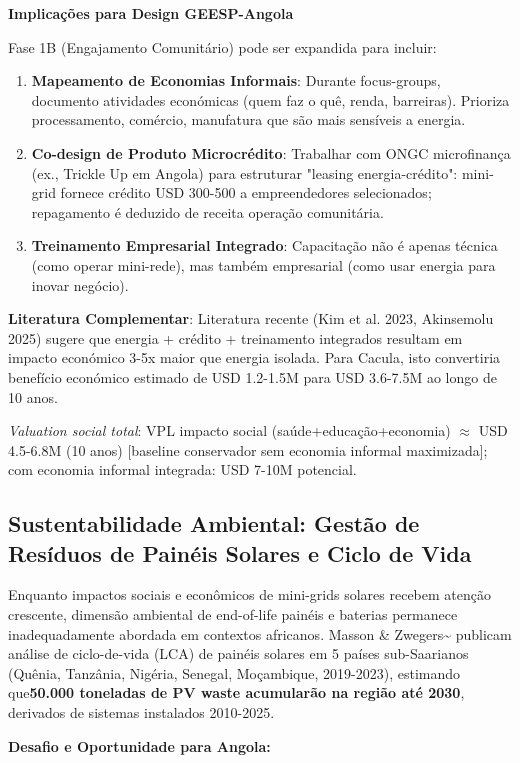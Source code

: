 \documentclass[12pt, a4paper]{article}
\begin{document}
\textbf{Implicações para Design GEESP-Angola}

Fase 1B (Engajamento Comunitário) pode ser expandida para incluir:
\begin{enumerate}
\item \textbf{Mapeamento de Economias Informais}: Durante focus-groups, documento atividades económicas (quem faz o quê, renda, barreiras). Prioriza processamento, comércio, manufatura que são mais sensíveis a energia.
\item \textbf{Co-design de Produto Microcrédito}: Trabalhar com ONGC microfinança (ex., Trickle Up em Angola) para estruturar "leasing energia-crédito": mini-grid fornece crédito USD 300-500 a empreendedores selecionados; repagamento é deduzido de receita operação comunitária.
\item \textbf{Treinamento Empresarial Integrado}: Capacitação não é apenas técnica (como operar mini-rede), mas também empresarial (como usar energia para inovar negócio).
\end{enumerate}

\textbf{Literatura Complementar}: Literatura recente (Kim et al. 2023, Akinsemolu 2025) sugere que energia + crédito + treinamento integrados resultam em impacto económico 3-5x maior que energia isolada. Para Cacula, isto convertiria benefício económico estimado de USD 1.2-1.5M para USD 3.6-7.5M ao longo de 10 anos.

\textit{Valuation social total}: VPL impacto social (saúde+educação+economia) $\approx$ USD 4.5-6.8M (10 anos) [baseline conservador sem economia informal maximizada]; com economia informal integrada: USD 7-10M potencial.

\subsection{Sustentabilidade Ambiental: Gestão de Resíduos de Painéis Solares e Ciclo de Vida}

Enquanto impactos sociais e econômicos de mini-grids solares recebem atenção crescente, dimensão ambiental de end-of-life painéis e baterias permanece inadequadamente abordada em contextos africanos. Masson \& Zwegers\textasciitilde{}\citep{Masson2023} publicam análise de ciclo-de-vida (LCA) de painéis solares em 5 países sub-Saarianos (Quênia, Tanzânia, Nigéria, Senegal, Moçambique, 2019-2023), estimando que\textbf{50.000 toneladas de PV waste acumularão na região até 2030}, derivados de sistemas instalados 2010-2025. 

\textbf{Desafio e Oportunidade para Angola:}
\end{document}
